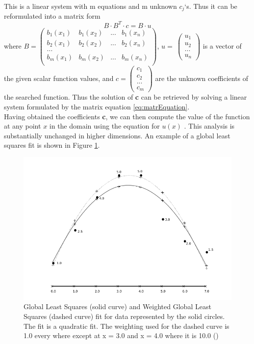 This is a linear system with m equations and m unknown $c_j$`s. Thus it can be reformulated into a matrix form
\begin{equation}
 B \cdot B^T \cdot c  = B\cdot u
 \label{eq:matrEquation}
\end{equation}
where $B = 
\begin{pmatrix}
	b_1(x_1) & b_1(x_2) & ... & b_1(x_n)\\
	b_2(x_1) & b_2(x_2) & ... & b_2(x_n)\\
	...\\
	b_m(x_1) & b_m(x_2) & ... & b_m(x_n)\\
\end{pmatrix}$, $u = \
\begin{pmatrix}
	u_1\\
	u_2\\
	...\\
	u_n
\end{pmatrix}$ is a vector of the given scalar function values, and $c = 
\begin{pmatrix}
	c_1\\
	c_2\\
	...\\
	c_m
\end{pmatrix}$ are the unknown coefficients of the searched function. Thus the solution of \textbf{c} can be retrieved by solving a linear system formulated by the matrix equation \ref{eq:matrEquation}.\\
Having obtained the coefficients \textbf{c}, we can then compute the value of the function at any point $x$ in the domain using the equation for $u(x)$ . This analysis is substantially unchanged in higher dimensions. An example of a global least squares fit is shown in Figure \ref{fig:gls_example}.
\begin{figure}[H]
	\begin{center}
		\includegraphics[width=\textwidth]{figures/GLS.png}
	\end{center}
	\caption{Global Least Squares (solid curve) and Weighted Global Least Squares (dashed curve) fit for data represented by the solid circles. The fit is a quadratic fit. The weighting used for the dashed curve is 1.0 every where except at x = 3.0 and x = 4.0 where it is 10.0 (\cite{MLSIntro})}
	\label{fig:gls_example}
\end{figure}
